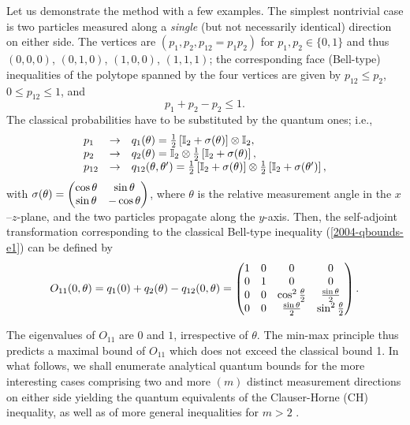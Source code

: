 \documentclass[prl,showpacs,showkeys,amsfonts,amsmath,twocolumn]{revtex4}
\begin{document}
Let us demonstrate the method with a few examples.
The simplest nontrivial case is two particles measured along a {\em single}
(but not necessarily identical) direction on either side.
The vertices are $(p_1,p_2,p_{12}=p_1p_2)$ for $p_1, p_2 \in \{0,1\}$ and thus
$(0,  0,  0)$,
$(0,  1,  0)$,
$(1,  0,  0)$,
$(1,  1,  1)$;
the corresponding face (Bell-type) inequalities of the polytope spanned by the four vertices
are given by
$p_{12} \le p_2$,
$0\le p_{12}\le 1$, and
\begin{equation}
p_1+p_2-p_{2}\le 1.
\label{2004-qbounds-e1}
\end{equation}
The classical probabilities have to be substituted by the quantum ones;
i.e.,
\begin{equation}
\begin{array}{lll}
p_1 &\rightarrow& q_1 (\theta ) =
{\frac{1}{2}}\left[{\mathbb I}_2 + {\bf \sigma}( \theta )\right] \otimes  {\mathbb I}_2,
\\
p_2 &\rightarrow& q_2 (\theta ) =
{\mathbb I}_2 \otimes {\frac{1}{2}}\left[{\mathbb I}_2 + {\bf \sigma}( \theta )\right],
\\
p_{12}&\rightarrow& q_{12} (\theta ,\theta ') =
{\frac{1}{2}}\left[{\mathbb I}_2 + {\bf \sigma}( \theta )\right]
\otimes
{\frac{1}{2}}\left[{\mathbb I}_2 + {\bf \sigma}( \theta ')\right],
\end{array}
\label{2004-qbounds-e2}
\end{equation}
with
$
{\bf \sigma}( \theta )=
\begin{pmatrix} \cos \theta & \sin \theta  \\
  \sin\theta & -\cos \theta
  \end{pmatrix}
$,
where $\theta $ is the relative measurement angle in the $x$--$z$-plane, and the two particles propagate along the $y$-axis.
Then, the self-adjoint transformation corresponding to the classical Bell-type inequality
(\ref{2004-qbounds-e1}) can be defined by
\begin{equation}
O_{11}(0,\theta) = q_1(0)+q_2(\theta)-q_{12} (0, \theta )
=
\begin{pmatrix}
   1 & 0 & 0 & 0 \cr 0 & 1 & 0 & 0 \cr 0 & 0 & {\cos^2
     \frac{\theta }{2}} & \frac{\sin \theta }
   {2} \cr 0 & 0 & \frac{\sin \theta }{2} & {\sin^2  \frac{\theta
     }{2}} \cr
 \end{pmatrix}.
\end{equation}

The eigenvalues of $O_{11}$ are $0$ and $1$, irrespective of $\theta$.
The min-max principle thus predicts a maximal bound of $O_{11}$
which does not exceed the classical bound 1.
In what follows, we shall enumerate analytical quantum bounds
for the more interesting cases comprising two and more $(m)$ distinct measurement directions on either
side yielding the quantum equivalents of the
Clauser-Horne (CH) inequality, as well as of more general inequalities
 for $m > 2$ \cite{2000-poly,collins-gisin-2003,sliwa-2003}.
\end{document}
